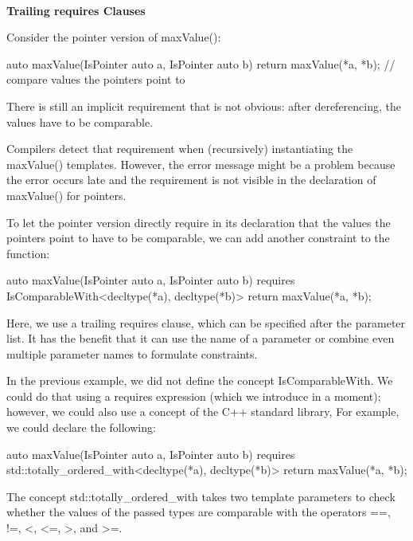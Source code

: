 \noindent
\hspace*{\fill} \\ %
\textbf{Trailing requires Clauses}

Consider the pointer version of maxValue():

\begin{cpp}
auto maxValue(IsPointer auto a, IsPointer auto b)
{
	return maxValue(*a, *b); // compare values the pointers point to
}
\end{cpp}

There is still an implicit requirement that is not obvious: after dereferencing, the values have to be comparable.

Compilers detect that requirement when (recursively) instantiating the maxValue() templates. However, the error message might be a problem because the error occurs late and the requirement is not visible in the declaration of maxValue() for pointers.

To let the pointer version directly require in its declaration that the values the pointers point to have to be comparable, we can add another constraint to the function:

\begin{cpp}
auto maxValue(IsPointer auto a, IsPointer auto b)
requires IsComparableWith<decltype(*a), decltype(*b)>
{
	return maxValue(*a, *b);
}
\end{cpp}

Here, we use a trailing requires clause, which can be specified after the parameter list. It has the benefit that it can use the name of a parameter or combine even multiple parameter names to formulate constraints.


In the previous example, we did not define the concept IsComparableWith. We could do that using a requires expression (which we introduce in a moment); however, we could also use a concept of the C++ standard library, For example, we could declare the following:

\begin{cpp}
auto maxValue(IsPointer auto a, IsPointer auto b)
requires std::totally_ordered_with<decltype(*a), decltype(*b)>
{
	return maxValue(*a, *b);
}
\end{cpp}

The concept std::totally\_ordered\_with takes two template parameters to check whether the values of the passed types are comparable with the operators ==, !=, <, <=, >, and >=.

